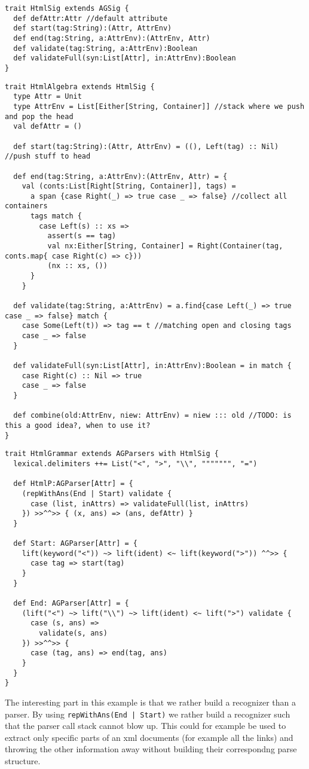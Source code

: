 \begin{lstlisting}
trait HtmlSig extends AGSig {
  def defAttr:Attr //default attribute
  def start(tag:String):(Attr, AttrEnv)
  def end(tag:String, a:AttrEnv):(AttrEnv, Attr)
  def validate(tag:String, a:AttrEnv):Boolean
  def validateFull(syn:List[Attr], in:AttrEnv):Boolean
}
\end{lstlisting}

\begin{lstlisting}
trait HtmlAlgebra extends HtmlSig {
  type Attr = Unit
  type AttrEnv = List[Either[String, Container]] //stack where we push and pop the head
  val defAttr = ()

  def start(tag:String):(Attr, AttrEnv) = ((), Left(tag) :: Nil) //push stuff to head

  def end(tag:String, a:AttrEnv):(AttrEnv, Attr) = {
    val (conts:List[Right[String, Container]], tags) =
      a span {case Right(_) => true case _ => false} //collect all containers
      tags match {
        case Left(s) :: xs =>
          assert(s == tag)
          val nx:Either[String, Container] = Right(Container(tag, conts.map{ case Right(c) => c}))
          (nx :: xs, ())
      }
    }

  def validate(tag:String, a:AttrEnv) = a.find{case Left(_) => true case _ => false} match {
    case Some(Left(t)) => tag == t //matching open and closing tags
    case _ => false
  }

  def validateFull(syn:List[Attr], in:AttrEnv):Boolean = in match {
    case Right(c) :: Nil => true
    case _ => false
  }

  def combine(old:AttrEnv, niew: AttrEnv) = niew ::: old //TODO: is this a good idea?, when to use it?
}
\end{lstlisting}

\begin{lstlisting}
trait HtmlGrammar extends AGParsers with HtmlSig {
  lexical.delimiters ++= List("<", ">", "\\", """"""", "=")

  def HtmlP:AGParser[Attr] = {
    (repWithAns(End | Start) validate {
      case (list, inAttrs) => validateFull(list, inAttrs)
    }) >>^^>> { (x, ans) => (ans, defAttr) }
  }

  def Start: AGParser[Attr] = {
    lift(keyword("<")) ~> lift(ident) <~ lift(keyword(">")) ^^>> {
      case tag => start(tag)
    }
  }

  def End: AGParser[Attr] = {
    (lift("<") ~> lift("\\") ~> lift(ident) <~ lift(">") validate {
      case (s, ans) =>
        validate(s, ans)
    }) >>^^>> {
      case (tag, ans) => end(tag, ans)
    }
  }
}
\end{lstlisting}

The interesting part in this example is that we rather build a recognizer than a parser. By using \verb/repWithAns(End | Start)/ we rather build a recognizer such that the parser call stack cannot blow up.
This could for example be used to extract only specific parts of an xml documents (for example all the links) and throwing the other information away without building their correspondng parse structure.
